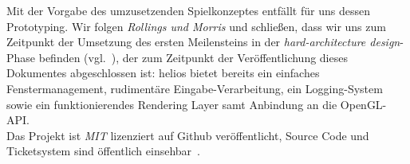 \noindent
Mit der Vorgabe des umzusetzenden Spielkonzeptes entfällt für uns dessen Prototyping.
Wir folgen \textit{Rollings und Morris} und schließen, dass wir uns zum Zeitpunkt der Umsetzung des ersten Meilensteins in der \textit{hard-architecture design}-Phase befinden (vgl.~\cite[628]{RM04}), der zum Zeitpunkt der Veröffentlichung dieses Dokumentes abgeschlossen ist: helios bietet bereits ein einfaches Fenstermanagement, rudimentäre Eingabe-Verarbeitung, ein Logging-System sowie ein funktionierendes Rendering Layer samt Anbindung an die OpenGL-API.\\

Das Projekt ist \textit{MIT} lizenziert auf Github veröffentlicht, Source Code und Ticketsystem sind öffentlich einsehbar~\cite[]{heliosgithub}.\\
